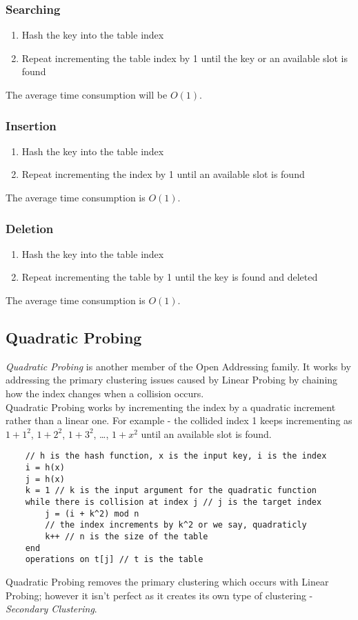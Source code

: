 \subsubsection{Searching}
\begin{enumerate}
    \item Hash the key into the table index
    \item Repeat incrementing the table index by 1 until the key or an available slot is found
\end{enumerate}
The average time consumption will be $O(1)$.
\subsubsection{Insertion}
\begin{enumerate}
    \item Hash the key into the table index
    \item Repeat incrementing the index by 1 until an available slot is found
\end{enumerate}
The average time consumption is $O(1)$.
\subsubsection{Deletion}
\begin{enumerate}
    \item Hash the key into the table index
    \item Repeat incrementing the table by 1 until the key is found and deleted
\end{enumerate}
The average time consumption is $O(1)$. 
\subsection{Quadratic Probing}
\textit{Quadratic Probing} is another member of the Open Addressing family. It works by addressing the primary clustering issues caused by Linear Probing by chaining how the index changes when a collision occurs.\\

Quadratic Probing works by incrementing the index by a quadratic increment rather than a linear one. For example - the collided index 1 keeps incrementing as $1+1^2$, $1+2^2$, $1+3^2$, \ldots, $1+x^2$ until an available slot is found.
\begin{verbatim}
    // h is the hash function, x is the input key, i is the index
    i = h(x)
    j = h(x) 
    k = 1 // k is the input argument for the quadratic function
    while there is collision at index j // j is the target index
        j = (i + k^2) mod n 
        // the index increments by k^2 or we say, quadraticly
        k++ // n is the size of the table
    end
    operations on t[j] // t is the table
\end{verbatim}
Quadratic Probing removes the primary clustering which occurs with Linear Probing; however it isn't perfect as it creates its own type of clustering - \textit{Secondary Clustering}. 

